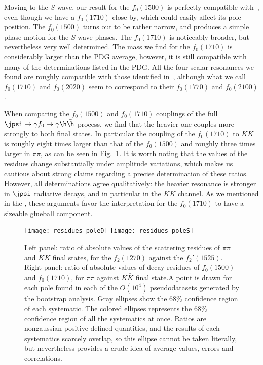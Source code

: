 Moving to the $S$-wave, our result for the $f_0(1500)$ is perfectly compatible with~\cite{Ropertz:2018stk}, even though  we have a $f_0(1710)$  close by, which could easily affect its pole position. The $f_0(1500)$ turns out to be rather narrow, and produces a simple phase motion for the $S$-wave phases. The $f_0(1710)$ is noticeably broader, but nevertheless very well determined. The mass we find for the 
 $f_0(1710)$ is considerably larger than the PDG average, however, it is still compatible with many of the determinations listed in the PDG. All the four scalar resonances we found are roughly compatible with those identified  in~\cite{Sarantsev:2021ein}, although what we call $f_0(1710)$ and $f_0(2020)$ seem to correspond to their $f_0(1770)$ and $f_0(2100)$. 

When comparing the $f_0(1500)$ and $f_0(1710)$ couplings of the full $\jpsi \to \gamma f_0 \to \gamma \h \bar \h$ process, we find that the heavier one couples more strongly to both final states. In particular the coupling of the $f_0(1710)$ 
 to $K \bar K$ is roughly eight times larger than that of the $f_0(1500)$  and roughly three times larger in $\pi\pi$, as can be seen in Fig.~\ref{fig:residues}. It is worth noting that the values of the residues change substantially  under amplitude variations,
 which makes us cautious about strong claims regarding a precise determination of these ratios. However, all determinations agree qualitatively: the heavier resonance is stronger in $\jpsi$ radiative decays, and in particular in the $K \bar K$ channel. As we mentioned in the , these arguments favor the interpretation for the $f_0(1710)$ to have a sizeable glueball component. 



\begin{figure}[t]
\centering
\texttt{[image: residues\_poleD]}  \texttt{[image: residues\_poleS]} 
\caption{Left panel: ratio of absolute values of the scattering residues  of $\pi\pi$ and $K\bar K$ final states, for the $f_2(1270)$ against the $f_2'(1525)$. Right panel: ratio of absolute values of decay residues of $f_0(1500)$ and $f_0(1710)$, for $\pi\pi$ against $K\bar K$ final state.A point is drawn for each pole found in each of the $O(10^4)$ pseudodatasets  generated by the bootstrap analysis. Gray ellipses show the $68\%$ confidence region of each systematic. The colored ellipses represents the $68\%$ confidence region of all the systematics at once. Ratios are nongaussian positive-defined quantities, and the results of each systematics scarcely overlap, so this ellipse cannot be taken literally, but nevertheless provides a crude idea of average values, errors and correlations. 
}
\label{fig:residues}
\end{figure}

